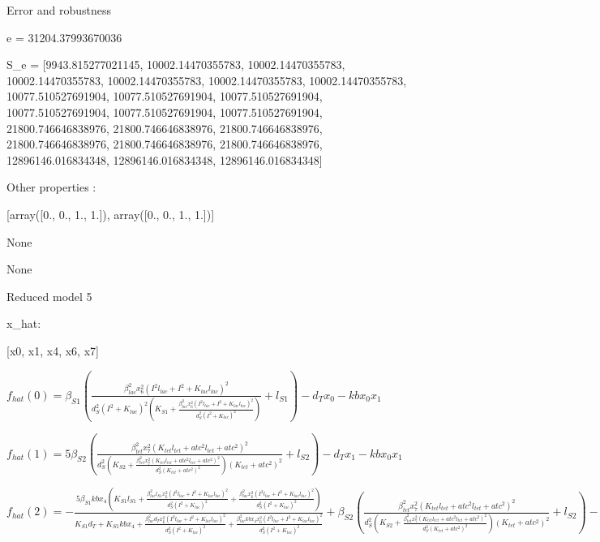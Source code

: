 Error and robustness 


e = 31204.37993670036

S_e = [9943.815277021145, 10002.14470355783, 10002.14470355783, 10002.14470355783, 10002.14470355783, 10002.14470355783, 10002.14470355783, 10077.510527691904, 10077.510527691904, 10077.510527691904, 10077.510527691904, 10077.510527691904, 10077.510527691904, 21800.746646838976, 21800.746646838976, 21800.746646838976, 21800.746646838976, 21800.746646838976, 21800.746646838976, 12896146.016834348, 12896146.016834348, 12896146.016834348]

Other properties :


[array([0., 0., 1., 1.]), array([0., 0., 1., 1.])]

None

None

Reduced model 5

x_{hat}: 

[x0, x1, x4, x6, x7]


$f_{hat}(0)=\beta_{S1} \left(\frac{\beta_{lac}^{2} x_{6}^{2} \left(I^{2} l_{lac} + I^{2} + K_{lac} l_{lac}\right)^{2}}{d_{S}^{2} \left(I^{2} + K_{lac}\right)^{2} \left(K_{S1} + \frac{\beta_{lac}^{2} x_{6}^{2} \left(I^{2} l_{lac} + I^{2} + K_{lac} l_{lac}\right)^{2}}{d_{S}^{2} \left(I^{2} + K_{lac}\right)^{2}}\right)} + l_{S1}\right) - d_{T} x_{0} - kb x_{0} x_{1}$


$f_{hat}(1)=5 \beta_{S2} \left(\frac{\beta_{tet}^{2} x_{7}^{2} \left(K_{tet} l_{tet} + atc^{2} l_{tet} + atc^{2}\right)^{2}}{d_{S}^{2} \left(K_{S2} + \frac{\beta_{tet}^{2} x_{7}^{2} \left(K_{tet} l_{tet} + atc^{2} l_{tet} + atc^{2}\right)^{2}}{d_{S}^{2} \left(K_{tet} + atc^{2}\right)^{2}}\right) \left(K_{tet} + atc^{2}\right)^{2}} + l_{S2}\right) - d_{T} x_{1} - kb x_{0} x_{1}$


$f_{hat}(2)=- \frac{5 \beta_{S1} kb x_{4} \left(K_{S1} l_{S1} + \frac{\beta_{lac}^{2} l_{S1} x_{6}^{2} \left(I^{2} l_{lac} + I^{2} + K_{lac} l_{lac}\right)^{2}}{d_{S}^{2} \left(I^{2} + K_{lac}\right)^{2}} + \frac{\beta_{lac}^{2} x_{6}^{2} \left(I^{2} l_{lac} + I^{2} + K_{lac} l_{lac}\right)^{2}}{d_{S}^{2} \left(I^{2} + K_{lac}\right)^{2}}\right)}{K_{S1} d_{T} + K_{S1} kb x_{4} + \frac{\beta_{lac}^{2} d_{T} x_{6}^{2} \left(I^{2} l_{lac} + I^{2} + K_{lac} l_{lac}\right)^{2}}{d_{S}^{2} \left(I^{2} + K_{lac}\right)^{2}} + \frac{\beta_{lac}^{2} kb x_{4} x_{6}^{2} \left(I^{2} l_{lac} + I^{2} + K_{lac} l_{lac}\right)^{2}}{d_{S}^{2} \left(I^{2} + K_{lac}\right)^{2}}} + \beta_{S2} \left(\frac{\beta_{tet}^{2} x_{7}^{2} \left(K_{tet} l_{tet} + atc^{2} l_{tet} + atc^{2}\right)^{2}}{d_{S}^{2} \left(K_{S2} + \frac{\beta_{tet}^{2} x_{7}^{2} \left(K_{tet} l_{tet} + atc^{2} l_{tet} + atc^{2}\right)^{2}}{d_{S}^{2} \left(K_{tet} + atc^{2}\right)^{2}}\right) \left(K_{tet} + atc^{2}\right)^{2}} + l_{S2}\right) - d_{T} x_{4}$


